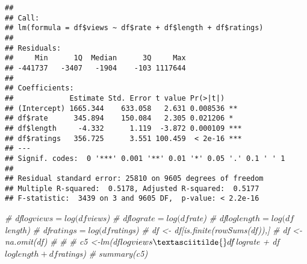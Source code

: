 \documentclass[
]{article}
\newenvironment{Shaded}{\begin{snugshade}}{\end{snugshade}}
\newcommand{\CommentTok}[1]{\textcolor[rgb]{0.56,0.35,0.01}{\textit{#1}}}
\newcommand{\FunctionTok}[1]{\textcolor[rgb]{0.00,0.00,0.00}{#1}}
\newcommand{\NormalTok}[1]{#1}
\newcommand{\OtherTok}[1]{\textcolor[rgb]{0.56,0.35,0.01}{#1}}
\newcommand{\SpecialCharTok}[1]{\textcolor[rgb]{0.00,0.00,0.00}{#1}}
\begin{document}
\begin{Shaded}
\end{Shaded}

\begin{verbatim}
## 
## Call:
## lm(formula = df$views ~ df$rate + df$length + df$ratings)
## 
## Residuals:
##     Min      1Q  Median      3Q     Max 
## -441737   -3407   -1904    -103 1117644 
## 
## Coefficients:
##             Estimate Std. Error t value Pr(>|t|)    
## (Intercept) 1665.344    633.058   2.631 0.008536 ** 
## df$rate      345.894    150.084   2.305 0.021206 *  
## df$length     -4.332      1.119  -3.872 0.000109 ***
## df$ratings   356.725      3.551 100.459  < 2e-16 ***
## ---
## Signif. codes:  0 '***' 0.001 '**' 0.01 '*' 0.05 '.' 0.1 ' ' 1
## 
## Residual standard error: 25810 on 9605 degrees of freedom
## Multiple R-squared:  0.5178, Adjusted R-squared:  0.5177 
## F-statistic:  3439 on 3 and 9605 DF,  p-value: < 2.2e-16
\end{verbatim}

\begin{Shaded}
\begin{Highlighting}[]
\CommentTok{\# df$logviews = log(df$views) }
\CommentTok{\# df$lograte =  log(df$rate) }
\CommentTok{\# df$loglength = log(df$length) }
\CommentTok{\# df$ratings = log(df$ratings)}
\CommentTok{\# df \textless{}{-} df[is.finite(rowSums(df)),]}
\CommentTok{\# df \textless{}{-} na.omit(df)}
\CommentTok{\# }
\CommentTok{\# }
\CommentTok{\# c5 \textless{}{-}lm(df$logviews \textasciitilde{} df$lograte + df$loglength + df$ratings)}
\CommentTok{\# summary(c5)}
\end{Highlighting}
\end{Shaded}
\end{document}
